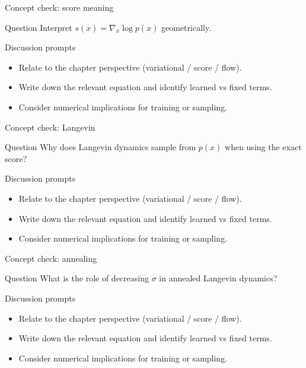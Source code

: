 \documentclass[aspectratio=169]{beamer}
\begin{document}
\begin{frame}{Concept check: score meaning}
\begin{block}{Question}
Interpret \(s(x)=\nabla_x\log p(x)\) geometrically.
\end{block}
\begin{block}{Discussion prompts}
\begin{itemize}
\item Relate to the chapter perspective (variational / score / flow).
\item Write down the relevant equation and identify learned vs fixed terms.
\item Consider numerical implications for training or sampling.
\end{itemize}
\end{block}
\end{frame}

\begin{frame}{Concept check: Langevin}
\begin{block}{Question}
Why does Langevin dynamics sample from \(p(x)\) when using the exact score?
\end{block}
\begin{block}{Discussion prompts}
\begin{itemize}
\item Relate to the chapter perspective (variational / score / flow).
\item Write down the relevant equation and identify learned vs fixed terms.
\item Consider numerical implications for training or sampling.
\end{itemize}
\end{block}
\end{frame}

\begin{frame}{Concept check: annealing}
\begin{block}{Question}
What is the role of decreasing \(\sigma\) in annealed Langevin dynamics?
\end{block}
\begin{block}{Discussion prompts}
\begin{itemize}
\item Relate to the chapter perspective (variational / score / flow).
\item Write down the relevant equation and identify learned vs fixed terms.
\item Consider numerical implications for training or sampling.
\end{itemize}
\end{block}
\end{frame}
\end{document}
